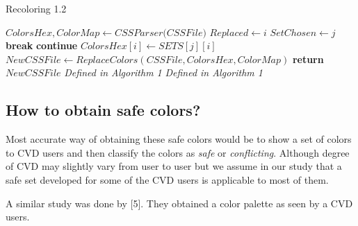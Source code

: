 \begin{algorithm}[!htb]
\caption{Recoloring 1.2}\label{Recolor 1.2}
\begin{algorithmic}[1]
\State ${ColorsHex,ColorMap} \gets \textit{CSSParser(CSSFile)}$ 
	 
        		\State $Replaced \gets i$ 
        		\State $SetChosen \gets j$
        		\State \textbf{break}
        	\EndIf
        \EndFor
      \EndFor
{}
	\State	\textbf{continue}
	\EndIf
	\State $ColorsHex[i] \gets SETS[j][i]$
\EndFor
\State $NewCSSFile \gets ReplaceColors(CSSFile, ColorsHex, ColorMap)$
\State \textbf{return} $NewCSSFile$
\EndProcedure
{}
\State \textit{Defined in Algorithm 1}
\EndProcedure
{}
\State \textit{Defined in Algorithm 1}
\EndProcedure
\end{algorithmic}
\end{algorithm}


\subsection{How to obtain safe colors?}
\label{Obtaining safe colors}
Most accurate way of obtaining these safe colors would be to show a set of colors to CVD users and then classify the colors as \textit{safe} or \textit{conflicting}. Although degree of CVD may slightly vary from user to user but we assume in our study that a safe set developed for some of the CVD users is applicable to most of them. 

A similar study was done by [5]. They obtained a color palette as seen by a CVD users. 

